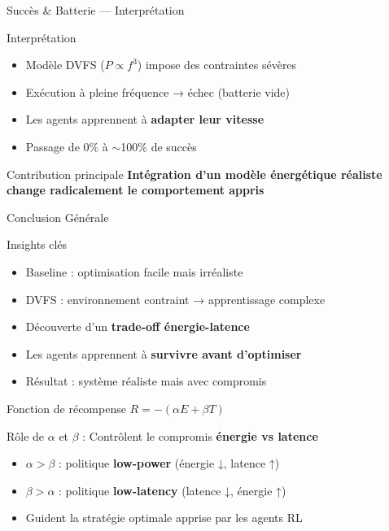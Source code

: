 \documentclass[10pt,aspectratio=169]{beamer}
\begin{document}
\begin{frame}{Succès \& Batterie — Interprétation}

\begin{block}{Interprétation}
\begin{itemize}
    \item Modèle DVFS ($P \propto f^3$) impose des contraintes sévères
    \item Exécution à pleine fréquence → échec (batterie vide)
    \item Les agents apprennent à \textbf{adapter leur vitesse}
    \item Passage de 0\% à $\sim$100\% de succès
\end{itemize}
\end{block}

\begin{alertblock}{Contribution principale}
\centering
\textbf{Intégration d’un modèle énergétique réaliste change radicalement le comportement appris}
\end{alertblock}
\end{frame}

\begin{frame}{Conclusion Générale}

\begin{block}{Insights clés}
\begin{itemize}
    \item Baseline : optimisation facile mais irréaliste
    \item DVFS : environnement contraint → apprentissage complexe
    \item Découverte d’un \textbf{trade-off énergie-latence}
    \item Les agents apprennent à \textbf{survivre avant d’optimiser}
    \item Résultat : système réaliste mais avec compromis
\end{itemize}
\end{block}

\begin{alertblock}{Fonction de récompense}
\centering
$R = -(\alpha E + \beta T)$
\end{alertblock}

\vspace{0.2cm}

\begin{block}{Rôle de $\alpha$ et $\beta$ : Contrôlent le compromis \textbf{énergie vs latence}}
\begin{itemize}
    \item $\alpha > \beta$ : politique \textbf{low-power} (énergie ↓, latence ↑)
    \item $\beta > \alpha$ : politique \textbf{low-latency} (latence ↓, énergie ↑)
    \item Guident la stratégie optimale apprise par les agents RL
\end{itemize}
\end{block}
\end{frame}
\end{document}
